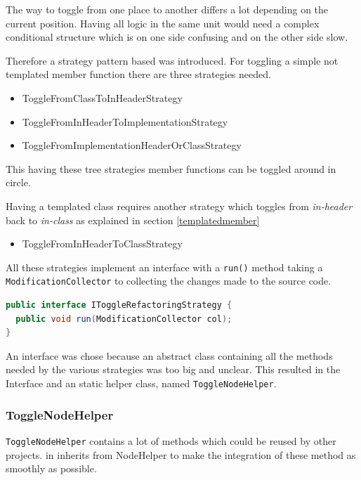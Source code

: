 The way to toggle from one place to another differs a lot depending on
the current position. Having all logic in the same unit would need a complex
conditional structure which is on one side confusing and on the other side
slow.

Therefore a strategy pattern based was introduced. For toggling a simple not
templated member function there are three strategies needed. 

\begin{itemize}
\item ToggleFromClassToInHeaderStrategy
\item ToggleFromInHeaderToImplementationStrategy
\item ToggleFromImplementationHeaderOrClassStrategy
\end{itemize}

This having these tree strategies member functions can be
toggled around in circle.\newline

Having a templated class requires another strategy which toggles from
\textit{in-header} back to \textit{in-class} as explained in section
\ref{templatedmember}

\begin{itemize}
\item ToggleFromInHeaderToClassStrategy
\end{itemize}

All these strategies implement an interface with a \texttt{run()} method taking
a \texttt{ModificationCollector} to collecting the changes made to the source
code.

\begin{lstlisting}[caption={IToggleRefactoringStrategy},
label={01templatedMember}, language=Java]
public interface IToggleRefactoringStrategy {
  public void run(ModificationCollector col);
}
\end{lstlisting}

An interface was chose because an abstract class containing all the methods
needed by the various strategies was too big and unclear. This resulted in the
Interface and an static helper class, named \texttt{ToggleNodeHelper}.

\subsubsection{ToggleNodeHelper}

\texttt{ToggleNodeHelper} contains a lot of methods which could be reused by
other projects. in inherits from NodeHelper to make the integration of these
method as smoothly as possible.

